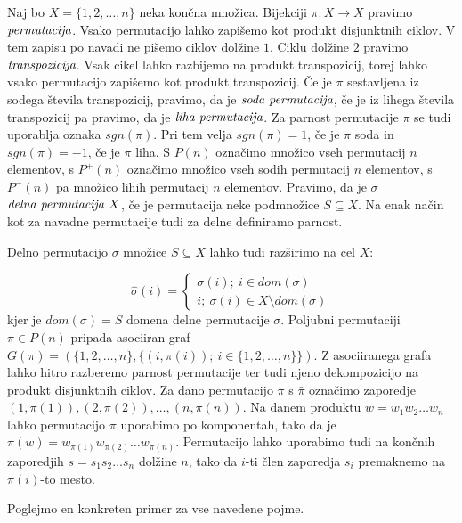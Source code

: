 \documentclass[mat1]{fmfdelo}
\newcommand{\pojem}[1]{\ensuremath{\emph{#1}}}
\newcommand{\map}[3]{\ensuremath{{#1}:{#2}\rightarrow{#3}}}
\begin{document}
\begin{definicija}
	Naj bo $X=\{1, 2, \ldots, n\}$ neka končna množica. Bijekciji $\map{\pi}{X}{X}$ pravimo \pojem{permutacija}. Vsako permutacijo lahko zapišemo kot produkt disjunktnih ciklov. V tem zapisu po navadi ne pišemo ciklov dolžine $1$. Ciklu dolžine $2$ pravimo \pojem{transpozicija}. Vsak cikel lahko razbijemo na produkt transpozicij, torej lahko vsako permutacijo zapišemo kot produkt transpozicij. Če je $\pi$ sestavljena iz sodega števila transpozicij, pravimo, da je \pojem{soda permutacija}, če je iz lihega števila transpozicij pa pravimo, da je \pojem{liha permutacija}. Za parnost permutacije $\pi$ se tudi uporablja oznaka $sgn(\pi)$. Pri tem velja $sgn(\pi)=1$, če je $\pi$ soda in $sgn(\pi) = -1$, če je $\pi$ liha. S $P(n)$ označimo množico vseh permutacij $n$ elementov, s $P^{+}(n)$ označimo množico vseh sodih permutacij $n$ elementov, s $P^{-}(n)$ pa množico lihih permutacij $n$ elementov. 
	Pravimo, da je $\sigma$ \pojem{delna permutacija $X$}, če je permutacija neke podmnožice $S\subseteq X$. Na enak način kot za navadne permutacije tudi za delne definiramo parnost.
	
	Delno permutacijo $\sigma$ množice $S\subseteq X$ lahko tudi razširimo na cel $X$:
	
	$$
	\hat{\sigma}(i) = \begin{cases*}
		\sigma(i);~i\in dom(\sigma) \\
		i;~\sigma(i) \in X\setminus dom(\sigma)
	\end{cases*}
	$$
	kjer je $dom(\sigma) = S$ domena delne permutacije $\sigma$.
	Poljubni permutaciji $\pi\in P(n)$ pripada asociiran graf $G(\pi) = (\{1, 2, \ldots, n\}, \{(i, \pi(i));~i\in \{1, 2, \ldots, n\}\})$. Z asociiranega grafa lahko hitro razberemo parnost permutacije ter tudi njeno dekompozicijo na produkt disjunktnih ciklov.
	Za dano permutacijo $\pi$ s $\bar{\pi}$ označimo zaporedje $(1, \pi(1)), (2, \pi(2)), \ldots, (n, \pi(n))$. Na danem produktu $w = w_1w_2\ldots w_n$ lahko permutacijo $\pi$ uporabimo po komponentah, tako da je $\pi(w) = w_{\pi(1)}w_{\pi(2)}\ldots w_{\pi(n)}$. Permutacijo lahko uporabimo tudi na končnih zaporedjih $s = s_1s_2\ldots s_n$ dolžine $n$, tako da $i$-ti člen zaporedja $s_i$ premaknemo na $\pi(i)$-to mesto.
\end{definicija}
Poglejmo en konkreten primer za vse navedene pojme.
\end{document}
